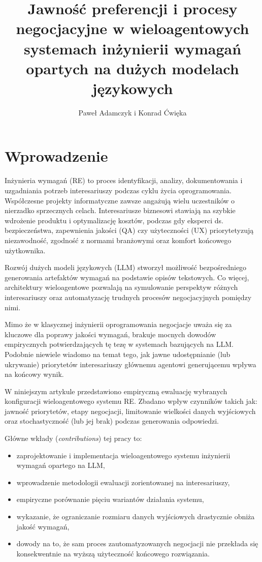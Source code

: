 \documentclass[conference]{IEEEtran}
\title{
Jawność preferencji i procesy negocjacyjne w wieloagentowych systemach inżynierii wymagań opartych na dużych modelach językowych
}
\author{
Paweł Adamczyk i Konrad Ćwięka
}
\begin{document}
\maketitle


\section{Wprowadzenie}

Inżynieria wymagań (RE) to proces identyfikacji, analizy, dokumentowania i uzgadniania potrzeb interesariuszy podczas cyklu życia oprogramowania. Współczesne projekty informatyczne zawsze angażują wielu uczestników o nierzadko sprzecznych celach. Interesariusze biznesowi stawiają na szybkie wdrożenie produktu i optymalizację kosztów, podczas gdy eksperci ds. bezpieczeństwa, zapewnienia jakości (QA) czy użyteczności (UX) priorytetyzują niezawodność, zgodność z normami branżowymi oraz komfort końcowego użytkownika.

Rozwój dużych modeli językowych (LLM) stworzył możliwość bezpośredniego generowania artefaktów wymagań na podstawie opisów tekstowych. Co więcej, architektury wieloagentowe pozwalają na symulowanie perspektyw różnych interesariuszy oraz automatyzację trudnych procesów negocjacyjnych pomiędzy nimi.

Mimo że w klasycznej inżynierii oprogramowania negocjacje uważa się za kluczowe dla poprawy jakości wymagań, brakuje mocnych dowodów empirycznych potwierdzających tę tezę w systemach bazujących na LLM. Podobnie niewiele wiadomo na temat tego, jak jawne udostępnianie (lub ukrywanie) priorytetów interesariuszy głównemu agentowi generującemu wpływa na końcowy wynik.

W niniejszym artykule przedstawiono empiryczną ewaluację wybranych konfiguracji wieloagentowego systemu RE. Zbadano wpływ czynników takich jak: jawność priorytetów, etapy negocjacji, limitowanie wielkości danych wyjściowych oraz stochastyczność (lub jej brak) podczas generowania odpowiedzi.

Główne wkłady (\textit{contributions}) tej pracy to:

\begin{itemize}
\item zaprojektowanie i implementacja wieloagentowego systemu inżynierii wymagań opartego na LLM,
\item wprowadzenie metodologii ewaluacji zorientowanej na interesariuszy,
\item empiryczne porównanie pięciu wariantów działania systemu,
\item wykazanie, że ograniczanie rozmiaru danych wyjściowych drastycznie obniża jakość wymagań,
\item dowody na to, że sam proces zautomatyzowanych negocjacji nie przekłada się konsekwentnie na wyższą użyteczność końcowego rozwiązania.
\end{itemize}
\end{document}
